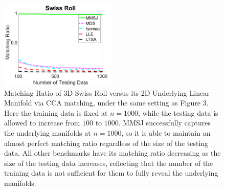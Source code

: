 \documentclass[11pt]{article}
\begin{document}
\begin{figure}[htbp]
  \centering
	\includegraphics[width=0.5\textwidth]{SwissRollSizeAcc2}
  \caption{ Matching Ratio of 3D Swiss Roll versus its 2D Underlying Linear Manifold via CCA matching, under the same setting as Figure 3. Here the training data is fixed at $n=1000$, while the testing data is allowed to increase from $100$ to $1000$. MMSJ successfully captures the underlying manifolds at $n=1000$, so it is able to maintain an almost perfect matching ratio regardless of the size of the testing data. All other benchmarks have its matching ratio decreasing as the size of the testing data increases, reflecting that the number of the training data is not sufficient for them to fully reveal the underlying manifolds.}
\end{figure}


\end{document}

